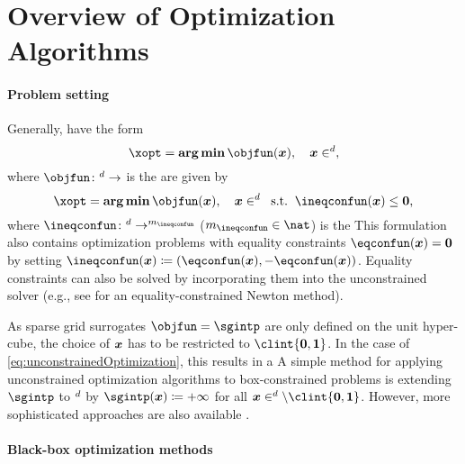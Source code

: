 \section{Overview of Optimization Algorithms}
\label{sec:51algorithms}

\paragraph{Problem setting}


Generally,  have the form
\begin{equation}
  \label{eq:unconstrainedOptimization}
  \xopt = \vecargmin \objfun(\*x),\quad
  \*x \in \real^d,
\end{equation}
where $\objfun\colon \real^d \to \real$ is the 
 are given by
\begin{equation}
  \label{eq:constrainedOptimization}
  \xopt = \vecargmin \objfun(\*x),\quad
  \*x \in \real^d\;\;\text{s.t.}\;\;
  \ineqconfun(\*x) \le \*0,
\end{equation}
where
$\ineqconfun\colon \real^d \to \real^{m_{\ineqconfun}}$
($m_{\ineqconfun} \in \nat$)
is the 
This formulation also contains optimization problems
with equality constraints $\eqconfun(\*x) = \*0$
by setting $\ineqconfun(\*x) \ceq (\eqconfun(\*x), -\eqconfun(\*x))$.
Equality constraints can also be solved by incorporating them
into the unconstrained solver (e.g., see \cite{Boyd04Convex}
for an equality-constrained Newton method).

As sparse grid surrogates $\objfun = \sgintp$ are only defined on the
unit hyper-cube,
the choice of ${\boldsymbol{x}}$ has to be restricted to $\clint{\*0, \*1}$.
In the case of \eqref{eq:unconstrainedOptimization},
this results in a 
A simple method for applying unconstrained optimization algorithms
to box-constrained problems is extending $\sgintp$ to $\real^d$ by
$\sgintp(\*x) \ceq +\infty$ for all $\*x \in \real^d \setminus \clint{\*0, \*1}$.
However, more sophisticated
approaches are also available \cite{More87Optimization}.

\paragraph{Black-box optimization methods}

